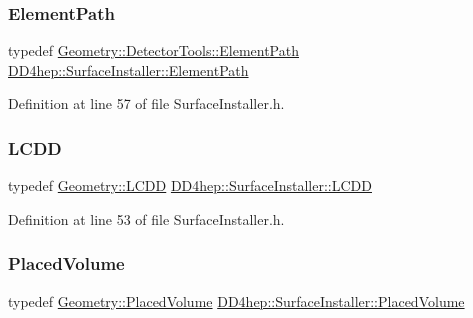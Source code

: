 \subsubsection{\texorpdfstring{Element\+Path}{ElementPath}}
{\footnotesize\ttfamily typedef \hyperlink{namespace_d_d4hep_1_1_geometry_1_1_detector_tools_a57c8f37a975258fd84676a69e74c56ab}{Geometry\+::\+Detector\+Tools\+::\+Element\+Path} \hyperlink{class_d_d4hep_1_1_surface_installer_a731a72c192bdf217f206f0a04ff9dea7}{D\+D4hep\+::\+Surface\+Installer\+::\+Element\+Path}\hspace{0.3cm}{\ttfamily [protected]}}



Definition at line 57 of file Surface\+Installer.\+h.

\hypertarget{class_d_d4hep_1_1_surface_installer_a155d137884c31b56d13fb58846e562a3}{}\label{class_d_d4hep_1_1_surface_installer_a155d137884c31b56d13fb58846e562a3} 
\subsubsection{\texorpdfstring{L\+C\+DD}{LCDD}}
{\footnotesize\ttfamily typedef \hyperlink{class_d_d4hep_1_1_geometry_1_1_l_c_d_d}{Geometry\+::\+L\+C\+DD} \hyperlink{class_d_d4hep_1_1_surface_installer_a155d137884c31b56d13fb58846e562a3}{D\+D4hep\+::\+Surface\+Installer\+::\+L\+C\+DD}\hspace{0.3cm}{\ttfamily [protected]}}



Definition at line 53 of file Surface\+Installer.\+h.

\hypertarget{class_d_d4hep_1_1_surface_installer_a48fe5565640dc158344c63c2fbb9c506}{}\label{class_d_d4hep_1_1_surface_installer_a48fe5565640dc158344c63c2fbb9c506} 
\subsubsection{\texorpdfstring{Placed\+Volume}{PlacedVolume}}
{\footnotesize\ttfamily typedef \hyperlink{class_d_d4hep_1_1_geometry_1_1_placed_volume}{Geometry\+::\+Placed\+Volume} \hyperlink{class_d_d4hep_1_1_surface_installer_a48fe5565640dc158344c63c2fbb9c506}{D\+D4hep\+::\+Surface\+Installer\+::\+Placed\+Volume}\hspace{0.3cm}{\ttfamily [protected]}}



